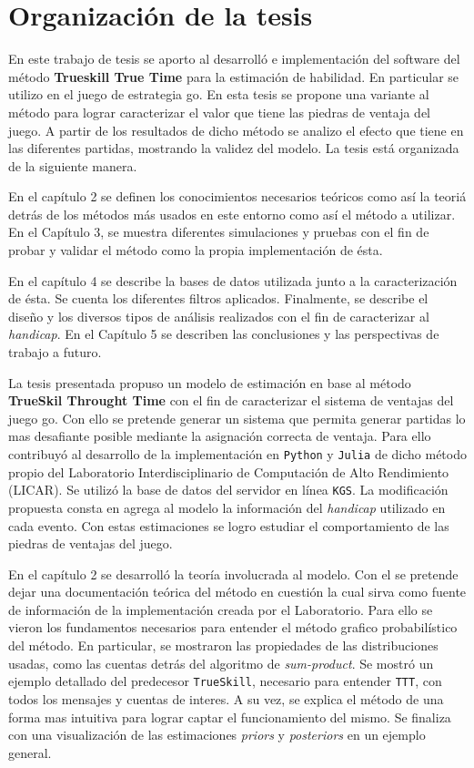 \documentclass[11pt,twoside, spanish]{report} %
\begin{document}
\section{Organizaci\'on de la tesis}


En este trabajo de tesis se aporto al desarroll\'o e implementaci\'on del software del m\'etodo \textbf{Trueskill True Time} para la estimaci\'on de habilidad.
En particular se utilizo en el juego de estrategia go.
En esta tesis se propone una variante al m\'etodo para lograr caracterizar el valor que tiene las piedras de ventaja del juego.
A partir de los resultados de dicho m\'etodo se analizo el efecto que tiene en las diferentes partidas, mostrando la validez del modelo.
La tesis est\'a organizada de la siguiente manera.

En el cap\'itulo 2 se definen los conocimientos necesarios te\'oricos como as\'i la teori\'a detr\'as de los m\'etodos m\'as usados en este entorno como as\'i el m\'etodo a utilizar.
En el Cap\'itulo 3, se muestra diferentes simulaciones y pruebas con el fin de probar y validar el m\'etodo como la propia implementaci\'on de \'esta.

En el cap\'itulo 4 se describe la bases de datos utilizada junto a la caracterizaci\'on de \'esta.
Se cuenta los diferentes filtros aplicados.
Finalmente, se describe el dise\~no y los diversos tipos de an\'alisis realizados con el fin de caracterizar al \textit{handicap}.
En el Cap\'itulo 5 se describen las conclusiones y las perspectivas de trabajo a futuro.

La tesis presentada propuso un modelo de estimaci\'on en base al m\'etodo \textbf{TrueSkil Throught Time} con el fin de caracterizar el sistema de ventajas del juego go.
Con ello se pretende generar un sistema que permita generar partidas lo mas desafiante posible mediante la asignaci\'on correcta de ventaja.
Para ello contribuy\'o al desarrollo de la implementaci\'on en \texttt{Python} y \texttt{Julia} de dicho m\'etodo propio del Laboratorio Interdisciplinario de Computaci\'on de Alto Rendimiento (LICAR).
Se utiliz\'o la base de datos del servidor en l\'inea \texttt{KGS}.
La modificaci\'on propuesta consta en agrega al modelo la informaci\'on del  \textit{handicap} utilizado en cada evento.
Con estas estimaciones se logro estudiar el comportamiento de las piedras de ventajas del juego.

En el cap\'itulo 2 se desarroll\'o la teor\'ia involucrada al modelo.
Con el se pretende dejar una documentaci\'on te\'orica del m\'etodo en cuesti\'on la cual sirva como fuente de informaci\'on de la implementaci\'on creada por el Laboratorio.
Para ello se vieron los fundamentos necesarios para entender el m\'etodo grafico  probabil\'istico del m\'etodo.
En particular, se mostraron las propiedades de las distribuciones usadas, como las cuentas detr\'as del algoritmo de \textit{sum-product}.
Se mostr\'o un ejemplo detallado del predecesor \texttt{TrueSkill}, necesario para entender  \texttt{TTT}, con todos los mensajes y cuentas de interes.
A su vez, se explica el m\'etodo de una forma mas intuitiva para lograr captar el funcionamiento del mismo.
Se finaliza con una visualizaci\'on de las estimaciones \textit{priors} y \textit{posteriors} en un ejemplo general. 
\end{document}
